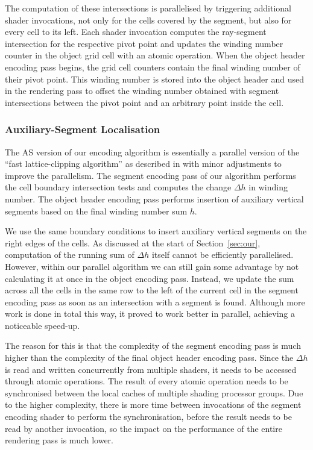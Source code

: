 \documentclass[11pt,a4paper,twoside]{article}
\begin{document}
The computation of these intersections is parallelised by triggering additional shader invocations, not only for the cells covered by the segment, but also for every cell to its left. Each shader invocation computes the ray-segment intersection for the respective pivot point and updates the winding number counter in the object grid cell with an atomic operation. When the object header encoding pass begins, the grid cell counters contain the final winding number of their pivot point. This winding number is stored into the object header and used in the rendering pass to offset the winding number obtained with segment intersections between the pivot point and an arbitrary point inside the cell.

\subsubsection{Auxiliary-Segment Localisation}

The AS version of our encoding algorithm is essentially a parallel version of the ``fast lattice-clipping algorithm'' as described in \cite{NehabHoppe08} with minor adjustments to improve the parallelism. The segment encoding pass of our algorithm performs the cell boundary intersection tests and computes the change  $\Delta{h}$ in winding number. The object header encoding pass performs insertion of auxiliary vertical segments based on the final winding number sum $h$.

We use the same boundary conditions to insert auxiliary vertical segments on the right edges of the cells. As discussed at the start of Section~\ref{sec:our}, computation of the running sum of $\Delta{h}$ itself cannot be efficiently parallelised. However, within our parallel algorithm we can still gain some advantage by not calculating it at once in the object encoding pass. Instead, we update the sum across all the cells in the same row to the left of the current cell in the segment encoding pass as soon as an intersection with a segment is found. Although more work is done in total this way, it proved to work better in parallel, achieving a noticeable speed-up.

The reason for this is that the complexity of the segment encoding pass is much higher than the complexity of the final object header encoding pass. Since the $\Delta{h}$ is read and written concurrently from multiple shaders, it needs to be accessed through atomic operations. The result of every atomic operation needs to be synchronised between the local caches of multiple shading processor groups. Due to the higher complexity, there is more time between invocations of the segment encoding shader to perform the synchronisation, before the result needs to be read by another invocation, so the impact on the performance of the entire rendering pass is much lower.
\end{document}
